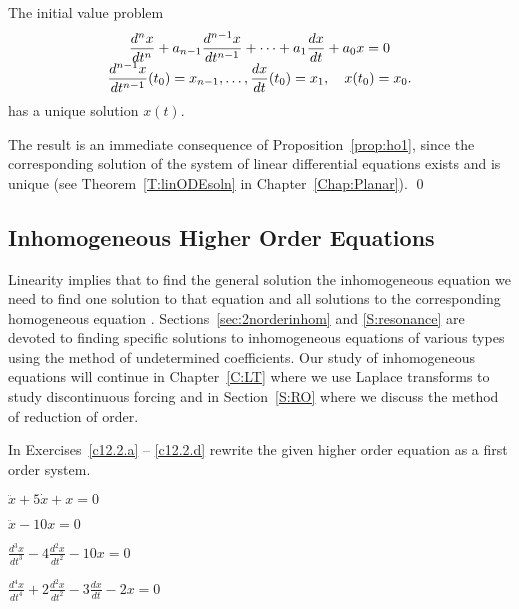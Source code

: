 \documentclass{ximera}
\begin{document}
\arraystart
\begin{thm}
The initial value problem
\begin{equation}
\begin{array}{c}
\displaystyle \frac{d^nx}{dt^n} + a_{n-1}\frac{d^{n-1}x}{dt^{n-1}} +
\cdots + a_1\frac{dx}{dt}+a_0x = 0\\
\displaystyle \frac{d^{n-1}x}{dt^{n-1}}(t_0)=x_{n-1},\ldots,\frac{dx}{dt}(t_0)=x_1,\quad
x(t_0)=x_0.
\end{array}
\end{equation}
has a unique solution $x(t)$.
\end{thm}
\arrayfinish

\proof The result is an immediate consequence of Proposition~\ref{prop:ho1},
since the corresponding solution of the system of linear differential
equations exists and is unique (see Theorem~\ref{T:linODEsoln} in 
Chapter~\ref{Chap:Planar}).
\qed

\subsection*{Inhomogeneous Higher Order Equations}

Linearity implies that to find the 
general solution the inhomogeneous
equation  we need to find one solution to that equation 
and all solutions to the corresponding homogeneous equation 
.  Sections~\ref{sec:2norderinhom} and \ref{S:resonance} 
are devoted to finding specific solutions to inhomogeneous equations of 
various types using the method of undetermined coefficients.  Our study of
inhomogeneous equations will continue in Chapter~\ref{C:LT} where we use 
Laplace transforms to study discontinuous forcing and in Section~\ref{S:RO}  
where we discuss the method of reduction of order.



\EXER

\TEXER


\noindent In Exercises~\ref{c12.2.a} -- \ref{c12.2.d} rewrite the given
higher order equation as a first order system.
\begin{exercise} \label{c12.2.a}
$\ddot{x}+5\dot{x}+x = 0$
\end{exercise}
\begin{exercise} \label{c12.2.b}
$\ddot{x}-10x = 0$
\end{exercise}
\begin{exercise} \label{c12.2.c}
$\frac{d^3x}{dt^3}-4\frac{d^2x}{dt^2}-10x = 0$
\end{exercise}
\begin{exercise} \label{c12.2.d}
$\frac{d^4x}{dt^4}+2\frac{d^2x}{dt^2}-3\frac{dx}{dt}-2x = 0$
\end{exercise}
\end{document}
